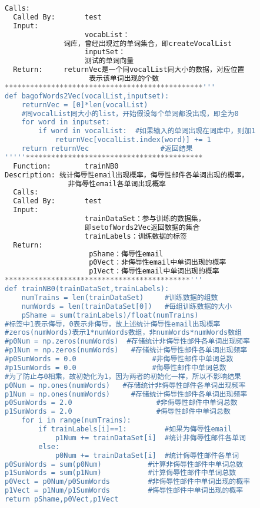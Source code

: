 \begin{lstlisting}[language=python]
  Calls:            
  Called By:       test 
  Input: 
                   vocabList： 
              词库，曾经出现过的单词集合，即createVocalList 
                   inputSet： 
                   测试的单词向量 
  Return:     returnVec是一个同vocalList同大小的数据，对应位置 
                    表示该单词出现的个数 
***********************************************'''  
def bagofWords2Vec(vocalList,inputset):  
    returnVec = [0]*len(vocalList)         
    #同vocalList同大小的list，开始假设每个单词都没出现，即全为0  
    for word in inputset:                                          
        if word in vocalList:  #如果输入的单词出现在词库中，则加1     
            returnVec[vocalList.index(word)] += 1  
    return returnVec                 #返回结果  
'''''****************************************** 
  Function:        trainNB0 
Description: 统计侮辱性email出现概率，侮辱性邮件各单词出现的概率，
               非侮辱性email各单词出现概率 
  Calls:            
  Called By:       test 
  Input: 
                   trainDataSet：参与训练的数据集，
                   即setofWords2Vec返回数据的集合 
                   trainLabels：训练数据的标签 
  Return:           
                    pShame：侮辱性email 
                    p0Vect：非侮辱性email中单词出现的概率 
                    p1Vect：侮辱性email中单词出现的概率 
********************************************'''  
def trainNB0(trainDataSet,trainLabels):  
    numTrains = len(trainDataSet)     #训练数据的组数  
    numWords = len(trainDataSet[0])   #每组训练数据的大小  
    pShame = sum(trainLabels)/float(numTrains)  
#标签中1表示侮辱，0表示非侮辱，故上述统计侮辱性email出现概率  
#zeros(numWords)表示1*numWords数组，非numWords*numWords数组  
#p0Num = np.zeros(numWords)  #存储统计非侮辱性邮件各单词出现频率  
#p1Num = np.zeros(numWords)   #存储统计侮辱性邮件各单词出现频率  
#p0SumWords = 0.0                  #非侮辱性邮件中单词总数  
#p1SumWords = 0.0                  #侮辱性邮件中单词总数  
#为了防止与0相乘，故初始化为1，因为两者的初始化一样，所以不影响结果  
p0Num = np.ones(numWords)   #存储统计非侮辱性邮件各单词出现频率  
p1Num = np.ones(numWords)     #存储统计侮辱性邮件各单词出现频率  
p0SumWords = 2.0                    #非侮辱性邮件中单词总数  
p1SumWords = 2.0                    #侮辱性邮件中单词总数  
    for i in range(numTrains):  
        if trainLabels[i]==1:         #如果为侮辱性email  
            p1Num += trainDataSet[i]  #统计非侮辱性邮件各单词  
        else:  
            p0Num += trainDataSet[i]  #统计侮辱性邮件各单词  
p0SumWords = sum(p0Num)           #计算非侮辱性邮件中单词总数  
p1SumWords = sum(p1Num)           #计算侮辱性邮件中单词总数  
p0Vect = p0Num/p0SumWords         #非侮辱性邮件中单词出现的概率  
p1Vect = p1Num/p1SumWords         #侮辱性邮件中单词出现的概率  
return pShame,p0Vect,p1Vect  
      

\end{lstlisting}
